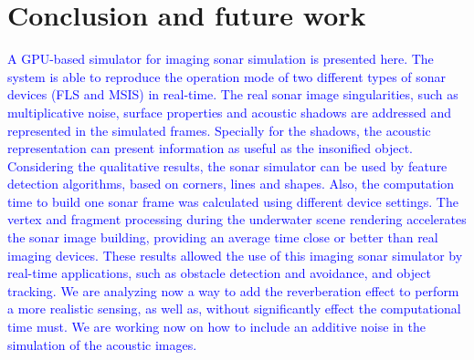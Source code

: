 \documentclass[final,5p,times]{elsarticle}
\begin{document}

\section{Conclusion and future work}
\label{conclusion}

\textcolor{blue}{A GPU-based simulator for imaging sonar simulation is presented here. The system is able to reproduce the operation mode of two different types of sonar devices (FLS and MSIS) in real-time. The real sonar image singularities, such as multiplicative noise, surface properties and acoustic shadows are addressed and represented in the simulated frames. Specially for the shadows, the acoustic representation can present information as useful as the insonified object. Considering the qualitative results, the sonar simulator can be used by feature detection algorithms, based on corners, lines and shapes. Also, the computation time to build one sonar frame was calculated using different device settings. The vertex and fragment processing during the underwater scene rendering accelerates the sonar image building, providing an average time close or better than real imaging devices. These results allowed the use of this imaging sonar simulator by real-time applications, such as obstacle detection and avoidance, and object tracking. We are analyzing now a way to add the reverberation effect to perform a more realistic sensing, as well as, without significantly effect the computational time must. We are working now on how to include an additive noise in the simulation of the acoustic images.}











\end{document}
